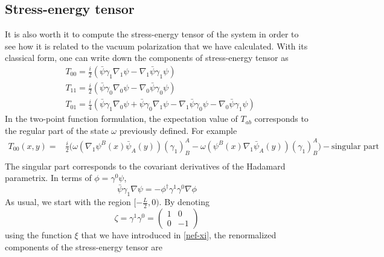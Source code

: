 \subsection{Stress-energy tensor}
It is also worth it to compute the stress-energy tensor of the system in order to see how it is related to the vacuum polarization that we have calculated.
With its classical form, one can write down the components of stress-energy tensor as
\begin{equation}
\begin{split}
& T_{00} = \frac{i}{2} (\bar{\psi} \gamma_1 \nabla_1 \psi - \nabla_1 \bar{\psi}\gamma_1 \psi)  \\
& T_{11} = \frac{i}{2} (\bar{\psi} \gamma_0 \nabla_0 \psi - \nabla_0 \bar{\psi}\gamma_0 \psi)  \\
& T_{01} = \frac{i}{4} (\bar{\psi} \gamma_1 \nabla_0 \psi +\bar{\psi} \gamma_0 \nabla_1 \psi - \nabla_1 \bar{\psi}\gamma_0 \psi - \nabla_0 \bar{\psi}\gamma_1 \psi)  
\end{split}
\end{equation}
In the two-point function formulation, the expectation value of $T_{ab}$ corresponds to the regular part of the state $\omega$ previously defined. For example
\begin{equation}
\begin{split}
T_{00}(x,y) = &
\frac{i}{2}\big(\omega( \nabla_1 \psi^B(x) \bar{\psi}_A(y))(\gamma_1)^A_B - \omega( \psi^B(x) \nabla_1 \bar{\psi}_A(y))(\gamma_1)^A_B \big) - \textrm{singular part}  \\
\end{split}
\end{equation}
The singular part corresponds to the covariant derivatives of the Hadamard parametrix.
In terms of $\phi = \gamma^0 \psi$, 
\begin{equation*}
\bar{\psi} \gamma_1 \nabla \psi = - \phi^\dagger \gamma^1 \gamma^0 \nabla \phi
\end{equation*}
As usual, we start with the region $[-\frac{L}{2}, 0)$. By denoting
\begin{equation*}
\zeta = \gamma^1 \gamma^0 = \begin{pmatrix}
1 & 0 \\
0 & -1
\end{pmatrix}
\end{equation*}
using the function $\xi$ that we have introduced in \cref{nef-xi}, 
the renormalized components of the stress-energy tensor are
